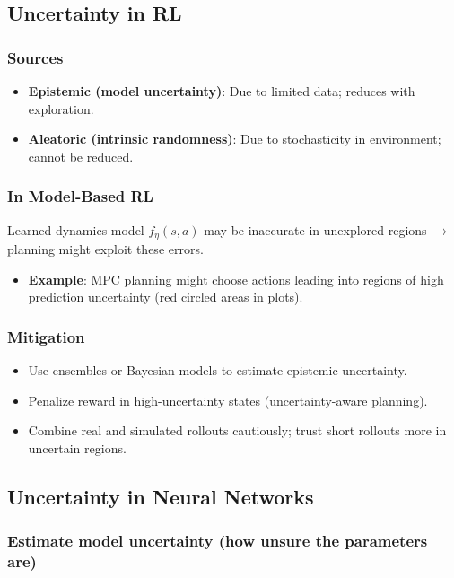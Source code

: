 \documentclass[12pt]{article}
\begin{document}
\subsection{Uncertainty in RL}

\subsubsection{Sources}
\begin{itemize}
    \item \textbf{Epistemic (model uncertainty)}: Due to limited data; reduces with exploration.
    \item \textbf{Aleatoric (intrinsic randomness)}: Due to stochasticity in environment; cannot be reduced.
\end{itemize}

\subsubsection{In Model-Based RL}
Learned dynamics model $f_\eta(s,a)$ may be inaccurate in unexplored regions $\rightarrow$ planning might exploit these errors.
\begin{itemize}
    \item \textbf{Example}: MPC planning might choose actions leading into regions of high prediction uncertainty (red circled areas in plots).
\end{itemize}

\subsubsection{Mitigation}
\begin{itemize}
    \item Use ensembles or Bayesian models to estimate epistemic uncertainty.
    \item Penalize reward in high-uncertainty states (uncertainty-aware planning).
    \item Combine real and simulated rollouts cautiously; trust short rollouts more in uncertain regions.
\end{itemize}

\subsection{Uncertainty in Neural Networks}

\subsubsection{Estimate model uncertainty (how unsure the parameters are)}
\end{document}
